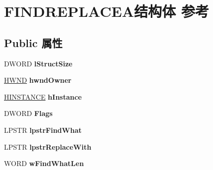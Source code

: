 \hypertarget{struct_f_i_n_d_r_e_p_l_a_c_e_a}{}\section{F\+I\+N\+D\+R\+E\+P\+L\+A\+C\+E\+A结构体 参考}
\label{struct_f_i_n_d_r_e_p_l_a_c_e_a}
\subsection*{Public 属性}
\begin{DoxyCompactItemize}
\item 
\mbox{\label{struct_f_i_n_d_r_e_p_l_a_c_e_a_a0cf458b970b5d3e843770ffd0008a86b}} 
D\+W\+O\+RD {\bfseries l\+Struct\+Size}
\item 
\mbox{\label{struct_f_i_n_d_r_e_p_l_a_c_e_a_aff07ce2d422a9ad7e9d140e02ef0cccc}} 
\hyperlink{interfacevoid}{H\+W\+ND} {\bfseries hwnd\+Owner}
\item 
\mbox{\label{struct_f_i_n_d_r_e_p_l_a_c_e_a_a625dfe84186b8edbd34ecae0221ec8cd}} 
\hyperlink{interfacevoid}{H\+I\+N\+S\+T\+A\+N\+CE} {\bfseries h\+Instance}
\item 
\mbox{\label{struct_f_i_n_d_r_e_p_l_a_c_e_a_ad2d2977d407637f352022f1739c8cabb}} 
D\+W\+O\+RD {\bfseries Flags}
\item 
\mbox{\label{struct_f_i_n_d_r_e_p_l_a_c_e_a_a61ac3f8bd3ffddcfb1402c9c813959de}} 
L\+P\+S\+TR {\bfseries lpstr\+Find\+What}
\item 
\mbox{\label{struct_f_i_n_d_r_e_p_l_a_c_e_a_a85f52ef8f6b97ac5875c6c3b65223f6d}} 
L\+P\+S\+TR {\bfseries lpstr\+Replace\+With}
\item 
\mbox{\label{struct_f_i_n_d_r_e_p_l_a_c_e_a_aea79ba02d234ae150ccf5f1ebd61deeb}} 
W\+O\+RD {\bfseries w\+Find\+What\+Len}
\item 
\mbox{\label{struct_f_i_n_d_r_e_p_l_a_c_e_a_aa1d7a9f448c276b0efda0e5f5785d366}} 

\end{DoxyCompactItemize}
